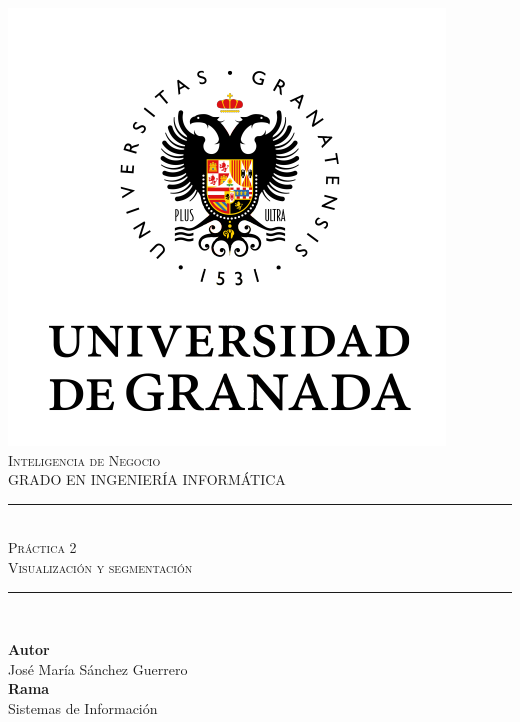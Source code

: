 \documentclass[11pt,a4paper]{article}
\newcommand{\asignatura}{Inteligencia de Negocio}
\newcommand{\autor}{José María Sánchez Guerrero}
\newcommand{\titulo}{Práctica 2}
\newcommand{\subtitulo}{Visualización y segmentación}
\begin{document}

\begin{titlepage}

\begin{minipage}{\textwidth}

\centering

\includegraphics[scale=0.5]{img/ugr.png}\\

\textsc{\Large \asignatura{}\\[0.2cm]}
\textsc{GRADO EN INGENIERÍA INFORMÁTICA}\\[1cm]

\noindent\rule[-1ex]{\textwidth}{1pt}\\[1.5ex]
\textsc{{\Huge \titulo\\[0.5ex]}}
\textsc{{\Large \subtitulo\\}}
\noindent\rule[-1ex]{\textwidth}{2pt}\\[3.5ex]

\end{minipage}

\vspace{0.5cm}

\begin{minipage}{\textwidth}

\centering

\textbf{Autor}\\ {\autor{}}\\[2.5ex]
\textbf{Rama}\\ {Sistemas de Información}\\[2.5ex]
\vspace{0.3cm}


\end{minipage}
\end{titlepage}
\end{document}
